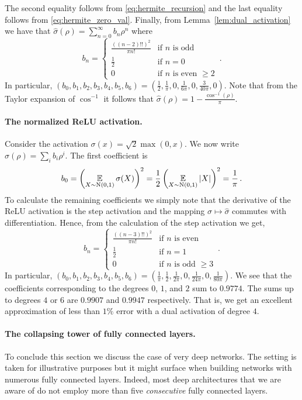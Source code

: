 The second equality follows from \eqref{eq:hermite_recursion} and
the last equality follows from \eqref{eq:hermite_zero_val}.
Finally, from Lemma~\ref{lem:dual_activation} we have that
$\hat\sigma(\rho)=\sum_{n=0}^\infty b_n\rho^n$ where
\[
b_n=\begin{cases}
\frac{((n-2)!!)^2}{\pi n!} & \text{if }n\text{ is odd}
\\
\frac{1}{2} & \text{if }n = 0
\\
0 & \text{if }n\text{ is even }\ge 2
\end{cases} \,.
\]
In particular, $(b_0,b_1,b_2,b_3,b_4,b_5,b_6) =
\left(\frac{1}{2},\frac{1}{\pi},0,\frac{1}{6\pi},0,\frac{3}{40\pi},0\right)$.
Note that from the Taylor expansion of $\cos^{-1}$ it follows
that $\hat\sigma(\rho)= 1 - \frac{\cos^{-1}(\rho)}{\pi}$.

\paragraph*{The normalized ReLU activation.}
%
Consider the activation $\sigma(x)=\sqrt{2}\max(0,x)$. We now write
$\hat\sigma(\rho)=\sum_{i} b_i\rho^i$. The first coefficient is
$$b_0 = \left(\operatorname*{\mathbb{E}}_{X\sim\text{N}(0,1)}\sigma(X)\right)^2 =
\frac{1}{2}\left(\operatorname*{\mathbb{E}}_{X\sim\text{N}(0,1)}|X|\right)^2 = \frac{1}{\pi} \,. $$
To calculate the remaining coefficients we simply note that the derivative
of the ReLU activation is the step activation and the mapping
$\sigma\mapsto\hat\sigma$ commutes with differentiation. Hence, from the
calculation of the step activation we get,
\[
b_n=\begin{cases}
\frac{((n-3)!!)^2}{\pi n!} & \text{if }n\text{ is even}
\\
\frac{1}{2} & \text{if }n = 1
\\
0 & \text{if }n\text{ is odd }\ge 3
\end{cases} \,.
\]
In particular, $(b_0,b_1,b_2,b_3,b_4,b_5,b_6) =
\left(\frac{1}{\pi}, \frac{1}{2}, \frac{1}{2\pi}, 0,
  \frac{1}{24\pi}, 0, \frac{1}{80\pi}\right)$.
We see that the coefficients corresponding to the degrees $0$, $1$, and $2$
sum to $0.9774$. The sums up to degrees $4$ or $6$ are $0.9907$ and
$0.9947$ respectively. That is, we get an excellent approximation of less
than $1\%$ error with a dual activation of degree $4$.

\paragraph*{The collapsing tower of fully connected layers.}
%
To conclude this section we discuss the case of very
deep networks. The setting is taken for illustrative purposes but
it might surface when building networks with numerous fully connected
layers. Indeed, most deep architectures that we are aware of do not employ
more than five {\em consecutive} fully connected layers.


